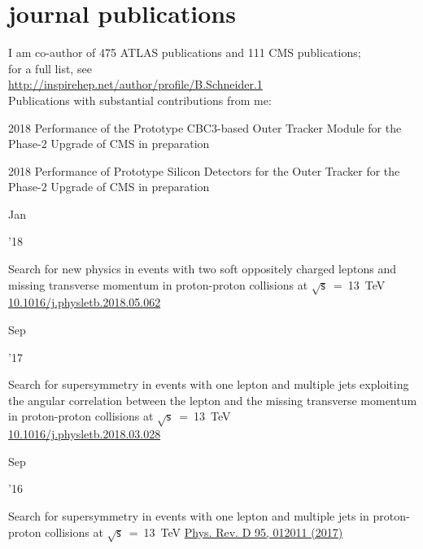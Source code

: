 \documentclass[]{cv} %
\begin{document}
\section{journal publications}
\begin{entrylist}

  \entry
  {}
  {I am co-author of 475 ATLAS publications and 111 CMS publications;\\
  for a full list, see \\
    \href{http://inspirehep.net/author/profile/B.Schneider.1}{http://inspirehep.net/author/profile/B.Schneider.1}\\
  Publications with substantial contributions from me:}
  {}
  {\vspace*{\spacingPubs}}

  \entry
  {2018}
  {Performance of the Prototype CBC3-based Outer Tracker Module for the Phase-2
  Upgrade of CMS}
  {in preparation}
  {\vspace*{\spacingPubs}}

  \entry
  {2018}
  {Performance of Prototype Silicon Detectors for the Outer Tracker for the
  Phase-2 Upgrade of CMS}
  {in preparation}
  {\vspace*{\spacingPubs}}

  \entry
  {\parbox[t]{\parboxWidthOne}{Jan}\parbox[t]{\parboxWidthTwo}{\hfill '18}}
  {Search for new physics in events with two soft oppositely charged leptons and missing transverse momentum in proton-proton collisions at $\sqrt{\mathsf{s}}$~=~13~TeV}
    {\href{https://www.sciencedirect.com/science/article/pii/S037026931830426X}{10.1016/j.physletb.2018.05.062}}
  {\vspace*{\spacingPubs}}

  \entry
  {\parbox[t]{\parboxWidthOne}{Sep}\parbox[t]{\parboxWidthTwo}{\hfill '17}}
  {Search for supersymmetry in events with one lepton and multiple jets exploiting the angular correlation between the lepton and the missing transverse momentum in proton-proton collisions at $\sqrt{\mathsf{s}}$~=~13~TeV\\}
    {\href{http://dx.doi.org/10.1016/j.physletb.2018.03.028}{10.1016/j.physletb.2018.03.028}}
  {\vspace*{\spacingPubs}}

  \entry
  {\parbox[t]{\parboxWidthOne}{Sep}\parbox[t]{\parboxWidthTwo}{\hfill '16}}
  {Search for supersymmetry in events with one lepton and multiple jets in proton-proton collisions at $\sqrt{\mathsf{s}}$~=~13~TeV}
    {\href{https://journals.aps.org/prd/abstract/10.1103/PhysRevD.95.012011}{Phys. Rev. D 95, 012011 (2017)}}
  {\vspace*{\spacingPubs}}

  \end{entrylist}
\end{document}
